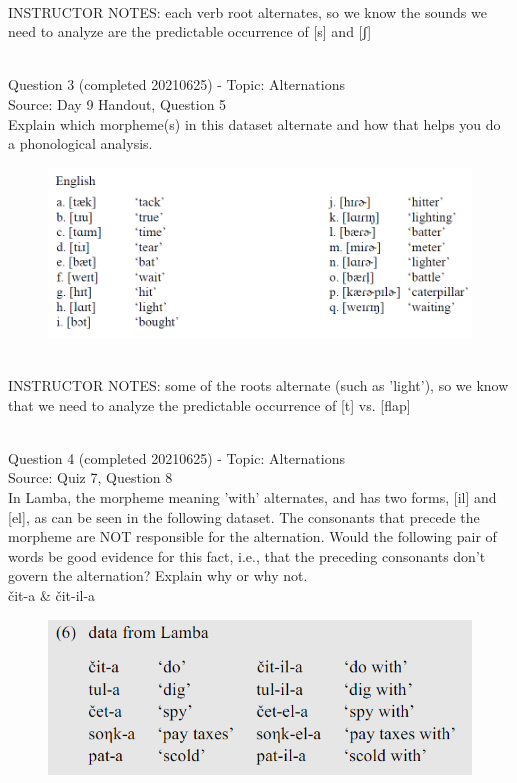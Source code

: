 \documentclass[12pt]{article}
\begin{document}
~\\
INSTRUCTOR NOTES: each verb root alternates, so we know the sounds we need to analyze are the predictable occurrence of [s] and [ʃ]


~\\

{\large Question 3} (completed 20210625) - Topic: Alternations\\
Source: Day 9 Handout, Question 5\\

Explain which morpheme(s) in this dataset alternate and how that helps you do a phonological analysis.\\

\begin{figure}[H]
\includegraphics{../images/english_t_flap.png}
\end{figure}

~\\
INSTRUCTOR NOTES: some of the roots alternate (such as 'light'), so we know that we need to analyze the predictable occurrence of [t] vs. [flap]


~\\

{\large Question 4} (completed 20210625) - Topic: Alternations\\
Source: Quiz 7, Question 8\\

In Lamba, the morpheme meaning 'with' alternates, and has two forms, [il] and [el], as can be seen in the following dataset. The consonants that precede the morpheme are NOT responsible for the alternation. Would the following pair of words be good evidence for this fact, i.e., that the preceding consonants don't govern the alternation? Explain why or why not.\\

čit-a \& čit-il-a

\begin{figure}[H]
\includegraphics{../images/peng119_lamba.png}
\end{figure}
\end{document}
